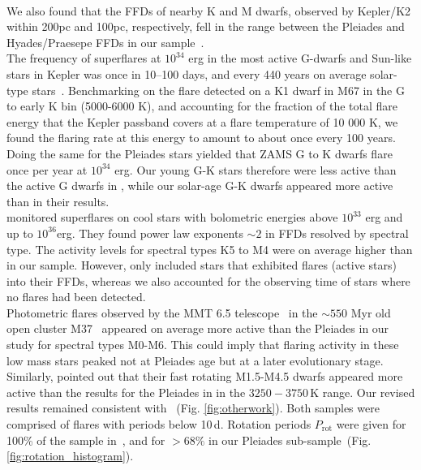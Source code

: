 \documentclass{aa}
\begin{document}
\\
We also found that the FFDs of nearby K and M dwarfs, observed by Kepler/K2 within 200pc and 100pc, respectively, fell in the range between the Pleiades and Hyades/Praesepe FFDs in our sample~\citep{lin2019}.
\\
The frequency of superflares at $10^{34}$ erg in the most active G-dwarfs and Sun-like stars in Kepler was once in 10–100 days, and every 440 years on average solar-type stars~\citep{shibayama2013}. Benchmarking on the flare detected on a K1 dwarf in M67 in the G to early K bin (5000-6000 K), and accounting for the fraction of the total flare energy that the Kepler passband covers at a flare temperature of 10 000 K, we found the flaring rate at this energy to amount to about once every 100 years. Doing the same for the Pleiades stars yielded that ZAMS G to K dwarfs flare once per year at $10^{34}$ erg. Our young G-K stars therefore were less active than the active G dwarfs in \citet{shibayama2013}, while our solar-age G-K dwarfs appeared more active than in their results.
\\
\citet{howard2019} monitored superflares on cool stars with bolometric energies above $10^{33}$ erg and up to $10^{36}$erg. They found power law exponents $\sim 2$ in FFDs resolved by spectral type. The activity levels for spectral types K5 to M4 were on average higher than in our sample. However, \citet{howard2019} only included stars that exhibited flares (active stars) into their FFDs, whereas we also accounted for the observing time of stars where no flares had been detected.
\\
Photometric flares observed by the MMT 6.5 telescope~\citep{hartman2008} in the $\sim550$ Myr old open cluster M37~\citep{chang2015} appeared on average more active than the Pleiades in our study for spectral types M0-M6. This could imply that flaring activity in these low mass stars peaked not at Pleiades age but at a later evolutionary stage. 
\\
Similarly, \citet{raetz2020} pointed out that their fast rotating M1.5-M4.5 dwarfs appeared more active than the results for the Pleiades in  in the $3250-3750\,$K range. Our revised results remained consistent with ~(Fig. \ref{fig:otherwork}). Both samples were comprised of flares with periods below 10\,d. Rotation periods $P_\mathrm{rot}$ were given for 100\% of the sample in~\cite{raetz2020}, and for \mbox{$>68\%$} in our Pleiades sub-sample~(Fig. \ref{fig:rotation_histogram}). 
\\
\end{document}
